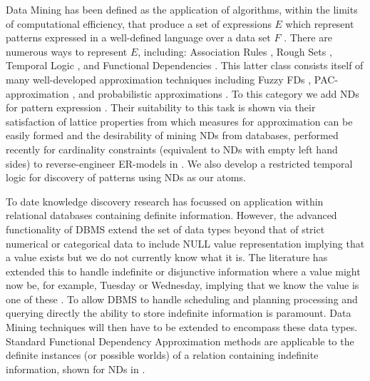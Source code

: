 Data Mining has been defined as the application of algorithms, within
the limits of computational efficiency, that produce a set of
expressions $E$ which represent patterns expressed in a well-defined
language over a data set $F$ \cite{kdd96}. There are numerous ways to
represent $E$, including: Association Rules \cite{ais93,toi96b}, Rough
Sets \cite{ziar91,incunc93}, Temporal Logic \cite{pt96,bt98}, and
Functional Dependencies \cite{km95}. This 
latter class consists itself of many well-developed approximation
techniques including Fuzzy FDs \cite{bdp94}, PAC-approximation
\cite{at94,km95}, and probabilistic approximations
\cite{psm93,pk95,hkp98}. To this category we add NDs for pattern
expression \cite{cl98}. Their suitability to this task is shown via
their satisfaction of lattice properties from which measures for
approximation can be easily formed and the desirability of
mining NDs from databases, performed recently for cardinality
constraints (equivalent to NDs with empty left hand sides) to
reverse-engineer ER-models in \cite{sou98}. We also develop a
restricted temporal logic for discovery of patterns using NDs as our atoms.

\medskip

To date knowledge discovery research has focussed on application
within relational databases containing definite information. However,
the advanced functionality of DBMS extend the set of
data types beyond that of strict numerical or categorical data to
include NULL value representation \cite{lip79,il84} implying that a value
exists but we do not currently know what it is. The literature has
extended this to handle indefinite or disjunctive information where a
value might now be, for example, Tuesday or Wednesday, implying that
we know the value is one of these \cite{inv91,vn95}.  To allow DBMS to
handle scheduling 
and planning processing and querying directly the ability to store 
indefinite information is paramount. Data Mining techniques will then
have to be extended to encompass these data types. Standard Functional
Dependency Approximation methods are applicable to the definite
instances (or possible worlds) of a relation containing indefinite
information, shown for NDs in \cite{cl98}.

\medskip
{}

